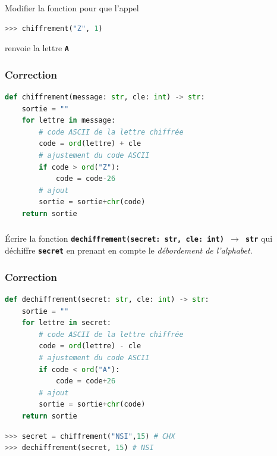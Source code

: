 \documentclass[svgnames,11pt]{beamer}
\begin{document}
\begin{frame}[fragile]
    \frametitle{}

    \begin{activite}
    Modifier la fonction pour que l'appel
\begin{center}
\begin{lstlisting}[language=Python , basicstyle=\ttfamily\small, xleftmargin=2em, xrightmargin=2em]
>>> chiffrement("Z", 1)
\end{lstlisting}
\end{center}
renvoie la lettre \textbf{\texttt{A}}
    \end{activite}

\end{frame}
\begin{frame}[fragile]
    \frametitle{Correction}

\begin{center}
\begin{lstlisting}[language=Python , basicstyle=\ttfamily\small, xleftmargin=0.2em, xrightmargin=0em]
def chiffrement(message: str, cle: int) -> str:
    sortie = ""
    for lettre in message:
        # code ASCII de la lettre chiffrée
        code = ord(lettre) + cle
        # ajustement du code ASCII
        if code > ord("Z"):
            code = code-26
        # ajout
        sortie = sortie+chr(code)
    return sortie
\end{lstlisting}
\end{center}

\end{frame}
\begin{frame}
    \frametitle{}

    \begin{activite}
    Écrire la fonction \textbf{\texttt{dechiffrement(secret: str, cle: int) $\rightarrow$ str}} qui déchiffre \textbf{\texttt{secret}} en prenant en compte le \emph{débordement de l'alphabet}.
    \end{activite}

\end{frame}
\begin{frame}[fragile]
    \frametitle{Correction}

\begin{center}
\begin{lstlisting}[language=Python , basicstyle=\ttfamily\small, xleftmargin=0.2em, xrightmargin=0em]
def dechiffrement(secret: str, cle: int) -> str:
    sortie = ""
    for lettre in secret:
        # code ASCII de la lettre chiffrée
        code = ord(lettre) - cle
        # ajustement du code ASCII
        if code < ord("A"):
            code = code+26
        # ajout
        sortie = sortie+chr(code)
    return sortie

\end{lstlisting}
\begin{lstlisting}[language=Python , basicstyle=\ttfamily\small, xleftmargin=0.2em, xrightmargin=0em]
>>> secret = chiffrement("NSI",15) # CHX
>>> dechiffrement(secret, 15) # NSI
\end{lstlisting}
\end{center}

\end{frame}
\end{document}
